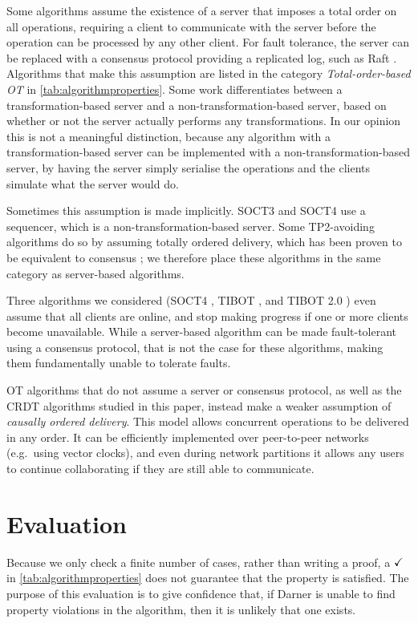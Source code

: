 \documentclass[sigplan,10pt,review,anonymous]{acmart}
\newcommand{\noviol}{\ensuremath{\checkmark\hphantom{{}^{*}}}}
\begin{document}
Some algorithms assume the existence of a server that imposes a total order on all operations, requiring a client to communicate with the server before the operation can be processed by any other client.
For fault tolerance, the server can be replaced with a consensus protocol providing a replicated log, such as Raft \cite{Ongaro2014}.
Algorithms that make this assumption are listed in the category \emph{Total-order-based OT} in \autoref{tab:algorithmproperties}.
Some work \cite{Sun2020arxiv} differentiates between a transformation-based server and a non-transformation-based server, based on whether or not the server actually performs any transformations. In our opinion this is not a meaningful distinction, because any algorithm with a transformation-based server can be implemented with a non-transformation-based server, by having the server simply serialise the operations and the clients simulate what the server would do.  

Sometimes this assumption is made implicitly.
SOCT3 and SOCT4 use a sequencer, which is a non-transformation-based server.
Some TP2-avoiding algorithms do so by assuming totally ordered delivery, which has been proven to be equivalent to consensus \cite{Chandra1996}; we therefore place these algorithms in the same category as server-based algorithms.

Three algorithms we considered (SOCT4 \cite{Vidot2000}, TIBOT \cite{Li2004ICPADS}, and TIBOT 2.0 \cite{Xu2014}) even assume that all clients are online, and stop making progress if one or more clients become unavailable.
While a server-based algorithm can be made fault-tolerant using a consensus protocol, that is not the case for these algorithms, making them fundamentally unable to tolerate faults.

OT algorithms that do not assume a server or consensus protocol, as well as the CRDT algorithms studied in this paper, instead make a weaker assumption of \emph{causally ordered delivery}.
This model allows concurrent operations to be delivered in any order.
It can be efficiently implemented over peer-to-peer networks (e.g.\ using vector clocks), and even during network partitions it allows any users to continue collaborating if they are still able to communicate.

\section{Evaluation}

Because we only check a finite number of cases, rather than writing a proof, a \noviol{} in \autoref{tab:algorithmproperties} does not guarantee that the property is satisfied. The purpose of this evaluation is to give confidence that, if Darner is unable to find property violations in the algorithm, then it is unlikely that one exists. 
\end{document}
